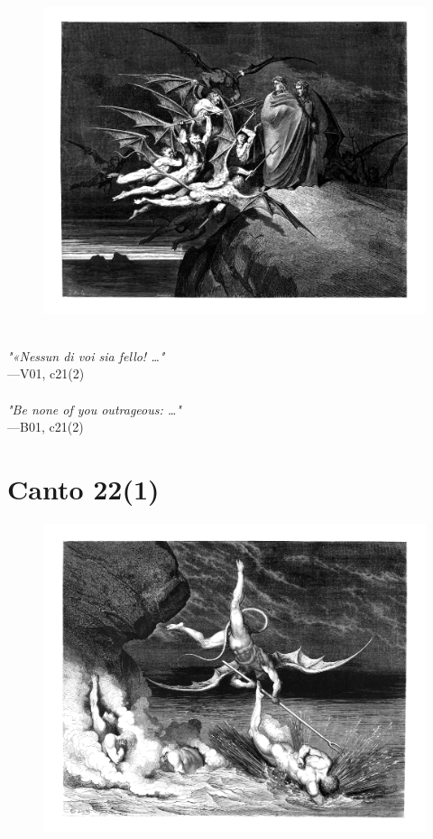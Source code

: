 \documentclass[../Dore_vision.tex]{subfiles}
\begin{document}
\begin{figure}[ht]
\centering
\includegraphics[height=\figsize]{illustrations/book_1/V01, c21(2).jpg}
\end{figure}

\begin{center}
\begin{minipage}{0.8\linewidth}
\textit{\\
"«Nessun di voi sia fello! …"} \\
—V01, c21(2) \\~\\
\textit{"Be none of you outrageous: …"} \\
—B01, c21(2)
\end{minipage}
\end{center}

\newpage

\section{Canto 22(1)}

\begin{figure}[ht]
\centering
\includegraphics[height=\figsize]{illustrations/book_1/V01, c22(1).jpg}
\end{figure}
\end{document}
